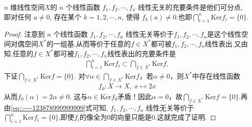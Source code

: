 \documentclass[../../main.tex]{subfiles}%
\begin{document}
\begin{corollary}\label{corollary:对偶空间的基的充要条件}
\( n \) 维线性空间$X$的 \( n \) 个线性函数 \( f_1, f_2, \cdots, f_n \) 线性无关的充要条件是他们可分点, 即对任何 \( a \neq 0 \), 存在某个 \( k = 1, 2, \cdots, n \), 使得 \( f_k(a) \neq 0 \).也即\( \bigcap_{i=1}^n \mathrm{Ker} f_i = \{0\} \).
\end{corollary}
\begin{proof}
注意到 \( n \) 个线性函数 \( f_1, f_2, \cdots, f_n \) 线性无关等价于\( f_1, f_2, \cdots, f_n \)是这个线性空间对偶空间$X^*$的一组基,从而等价于任意的$f\in X^*$都可被\( f_1, f_2, \cdots, f_n \)线性表出.又由知,任意的$f\in X^*$都可被\( f_1, f_2, \cdots, f_n \)线性表出的充要条件是
\begin{align}
\bigcap_{i=1}^n \mathrm{Ker} f_i \subset \bigcap_{f \in X^*} \mathrm{Ker} f,\label{eq::----123878999999999}
\end{align}
下证$\bigcap_{f \in X^*} \mathrm{Ker} f = \{0\}$. 对$\forall \alpha \in \bigcap_{f \in X^*} \mathrm{Ker} f$，若$\alpha \neq 0$，则$X^*$中存在线性函数
\begin{align*}
f_0: X \longrightarrow X,\ x \longmapsto 2x
\end{align*}
从而$f_0(\alpha) = 2\alpha \neq 0$. 这与$\alpha \in \mathrm{Ker} f_0$矛盾！因此$\alpha = 0$，故$\bigcap_{f \in X^*} \mathrm{Ker} f = \{0\}$.再由\eqref{eq::----123878999999999}式可知, \( f_1, f_2, \cdots, f_n \) 线性无关等价于 \( \bigcap_{i=1}^n \mathrm{Ker} f_i = \{0\} \),即使$f_i$的像全为0的向量只能是0.这就完成了证明.
\end{proof}
\end{document}
